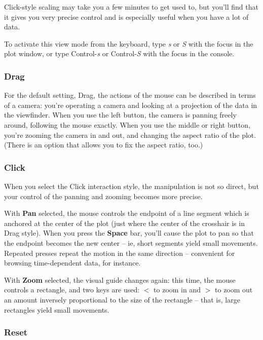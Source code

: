 \documentclass[11pt]{article}
\begin{document}
Click-style scaling may take you a few minutes to get used to, but
you'll find that it gives you very precise control and is especially
useful when you have a lot of data.

To activate this view mode from the keyboard, type {\em s} or {\em S}
with the focus in the plot window, or type Control-{\em s} or
Control-{\em S} with the focus in the console.

\subsubsection{Drag}

For the default setting, Drag, the actions of the mouse can be
described in terms of a camera:  you're operating a camera and
looking at a projection of the data in the viewfinder.  When you use
the left button, the camera is panning freely around, following the
mouse exactly.  When you use the middle or right button, you're
zooming the camera in and out, and changing the aspect ratio of
the plot.  (There is an option that allows you to fix the
aspect ratio, too.)

\subsubsection{Click}

When you select the Click interaction style, the manipulation is
not so direct, but your control of the panning and zooming becomes
more precise.

With {\bf Pan} selected, the mouse controls the endpoint of a line
segment which is anchored at the center of the plot (just where the
center of the crosshair is in Drag style).  When you press the {\bf
Space} bar, you'll cause the plot to pan so that the endpoint becomes
the new center -- ie, short segments yield small movements.  Repeated
presses repeat the motion in the same direction -- convenient for
browsing time-dependent data, for instance.

With {\bf Zoom} selected, the visual guide changes again: this time,
the mouse controls a rectangle, and two keys are used: {\boldmath $<$}
to zoom in and {\boldmath $>$} to zoom out an amount inversely
proportional to the size of the rectangle -- that is, large rectangles
yield small movements.

\subsubsection{Reset}
\end{document}
